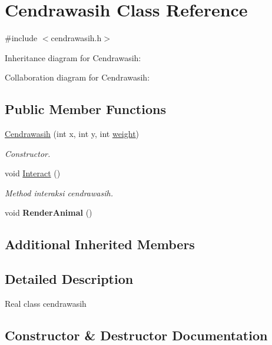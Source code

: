 \hypertarget{classCendrawasih}{}\section{Cendrawasih Class Reference}
\label{classCendrawasih}


{\ttfamily \#include $<$cendrawasih.\+h$>$}



Inheritance diagram for Cendrawasih\+:


Collaboration diagram for Cendrawasih\+:
\subsection*{Public Member Functions}
\begin{DoxyCompactItemize}
\item 
\hyperlink{classCendrawasih_ad86651b1341d460fb7cf1c9593133ab7}{Cendrawasih} (int x, int y, int \hyperlink{classAnimal_a9a3b22f243f7109c57f36b3c660feb6e}{weight})
\begin{DoxyCompactList}\small\item\em Constructor. \end{DoxyCompactList}\item 
void \hyperlink{classCendrawasih_a959e53e586607cce27f0f84f09bd7505}{Interact} ()\hypertarget{classCendrawasih_a959e53e586607cce27f0f84f09bd7505}{}\label{classCendrawasih_a959e53e586607cce27f0f84f09bd7505}

\begin{DoxyCompactList}\small\item\em Method interaksi cendrawasih. \end{DoxyCompactList}\item 
void {\bfseries Render\+Animal} ()\hypertarget{classCendrawasih_af7481f706ae8d2c57f50060a13202017}{}\label{classCendrawasih_af7481f706ae8d2c57f50060a13202017}

\end{DoxyCompactItemize}
\subsection*{Additional Inherited Members}


\subsection{Detailed Description}
Real class cendrawasih 

\subsection{Constructor \& Destructor Documentation}
